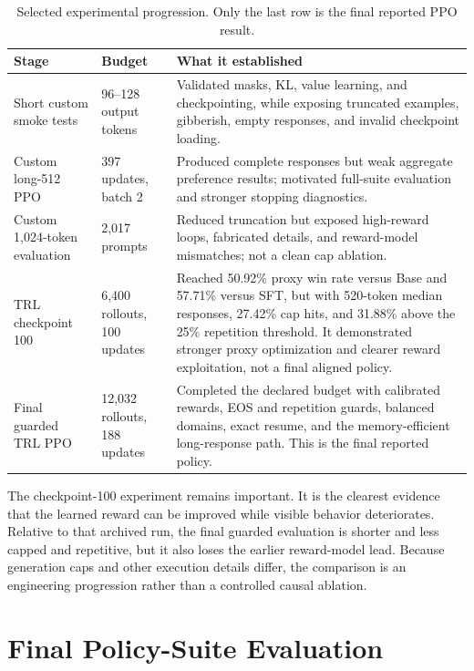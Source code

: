 \documentclass[11pt]{article}
\begin{document}
\begin{table}[H]
\centering
\small
\caption{Selected experimental progression. Only the last row is the final
reported PPO result.}
\label{tab:history}
\begin{tabularx}{\textwidth}{@{}p{}p{}Y@{}}
\toprule
\textbf{Stage} & \textbf{Budget} & \textbf{What it established}\\
\midrule
Short custom smoke tests & 96--128 output tokens &
Validated masks, KL, value learning, and checkpointing, while exposing
truncated examples, gibberish, empty responses, and invalid checkpoint loading.\\
Custom long-512 PPO & 397 updates, batch 2 &
Produced complete responses but weak aggregate preference results; motivated
full-suite evaluation and stronger stopping diagnostics.\\
Custom 1,024-token evaluation & 2,017 prompts &
Reduced truncation but exposed high-reward loops, fabricated details, and
reward-model mismatches; not a clean cap ablation.\\
TRL checkpoint 100 & 6,400 rollouts, 100 updates &
Reached 50.92\% proxy win rate versus Base and 57.71\% versus SFT, but with
520-token median responses, 27.42\% cap hits, and 31.88\% above the 25\%
repetition threshold. It demonstrated stronger proxy optimization and clearer
reward exploitation, not a final aligned policy.\\
Final guarded TRL PPO & 12,032 rollouts, 188 updates &
Completed the declared budget with calibrated rewards, EOS and repetition
guards, balanced domains, exact resume, and the memory-efficient long-response
path. This is the final reported policy.\\
\bottomrule
\end{tabularx}
\end{table}

The checkpoint-100 experiment remains important. It is the clearest evidence
that the learned reward can be improved while visible behavior deteriorates.
Relative to that archived run, the final guarded evaluation is shorter and
less capped and repetitive, but it also loses the earlier reward-model lead.
Because generation caps and other execution details differ, the comparison is
an engineering progression rather than a controlled causal ablation.

\section{Final Policy-Suite Evaluation}
\end{document}

